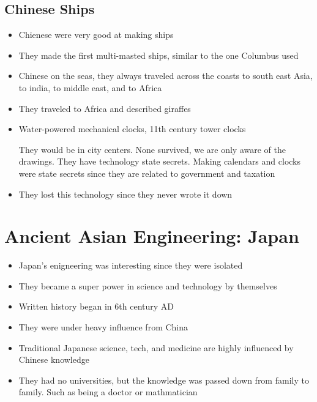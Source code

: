 \documentclass{article}
\begin{document}
\subsection{Chinese Ships}
\begin{itemize}
  \item Chienese were very good at making ships
  \item They made the first multi-masted ships, similar
    to the one Columbus used
  \item Chinese on the seas, they always traveled across the coasts to south east Asia,
    to india, to middle east, and to Africa
  \item They traveled to Africa and described giraffes
  \item Water-powered mechanical clocks, 11th century tower clocks

    They would be in city centers. None survived,
    we are only aware of the drawings.
    They have technology state secrets. Making calendars
    and clocks were state secrets since they are related
    to government and taxation
  \item They lost this technology since they never wrote it down
\end{itemize}

\section{Ancient Asian Engineering: Japan}
\begin{itemize}
  \item Japan's enigneering was interesting since
    they were isolated
  \item They became a super power in science and technology by themselves
  \item Written history began in 6th century AD
  \item They were under heavy influence from China
  \item Traditional Japanese science, tech, and medicine are highly influenced by
    Chinese knowledge
  \item They had no universities, but the knowledge was passed down
    from family to family. Such as being a doctor or mathmatician
\end{itemize}
\end{document}
